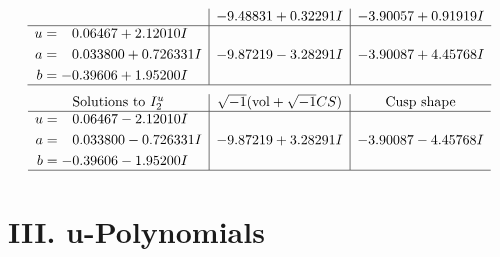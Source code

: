 \documentclass[1p]{elsarticle_modified}
\theoremstyle{definition}
\newcommand{\I}{\sqrt{-1}}
\begin{document}
$$\begin{array}{c|c|c}
 & -9.48831 + 0.32291 I & -3.90057 + 0.91919 I \\ \hline\begin{aligned}
u &= \phantom{-}0.06467 + 2.12010 I \\
a &= \phantom{-}0.033800 + 0.726331 I \\
b &= -0.39606 + 1.95200 I\end{aligned}
 & -9.87219 - 3.28291 I & -3.90087 + 4.45768 I\\
 \hline 
 \end{array}$$\newpage$$\begin{array}{c|c|c}  
\text{Solutions to }I^u_{2}& \I (\text{vol} + \sqrt{-1}CS) & \text{Cusp shape}\\
 \hline 
\begin{aligned}
u &= \phantom{-}0.06467 - 2.12010 I \\
a &= \phantom{-}0.033800 - 0.726331 I \\
b &= -0.39606 - 1.95200 I\end{aligned}
 & -9.87219 + 3.28291 I & -3.90087 - 4.45768 I\\
 \hline 
 \end{array}$$\newpage
\newpage\renewcommand{\arraystretch}{1}
\centering \section*{ III. u-Polynomials}
\end{document}
